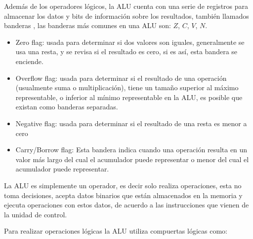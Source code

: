 \documentclass[journal]{IEEEtran}
\begin{document}
	Además de los operadores lógicos, la ALU cuenta con una serie de registros para almacenar los datos y bits de información sobre los resultados, también llamados banderas \cite{Garcia}, las banderas más comunes en una ALU son: $Z$, $C$, $V$, $N$.
	\begin{itemize}
		\item Zero flag: usada para determinar si dos valores son iguales, generalmente se usa una resta, y se revisa si el resultado es cero, si es así, esta bandera se enciende.
		\item Overflow flag: usada para determinar si el resultado de una operación (usualmente suma o multiplicación), tiene un tamaño superior al máximo representable, o inferior al mínimo representable en la ALU, es posible que existan como banderas separadas.
		\item Negative flag: usada para determinar si el resultado de una resta es menor a cero
		\item Carry/Borrow flag: Esta bandera indica cuando una operación  resulta en un valor más largo del cual el acumulador puede representar o menor del cual el acumulador puede representar.
	\end{itemize}
	
	La ALU es simplemente un operador, es decir solo realiza operaciones, esta no toma decisiones, acepta datos binarios que están almacenados en la memoria y ejecuta operaciones con estos datos, de acuerdo a las instrucciones que vienen de la unidad de control.
	
	Para realizar operaciones lógicas la ALU utiliza compuertas lógicas como:
	
\end{document}
